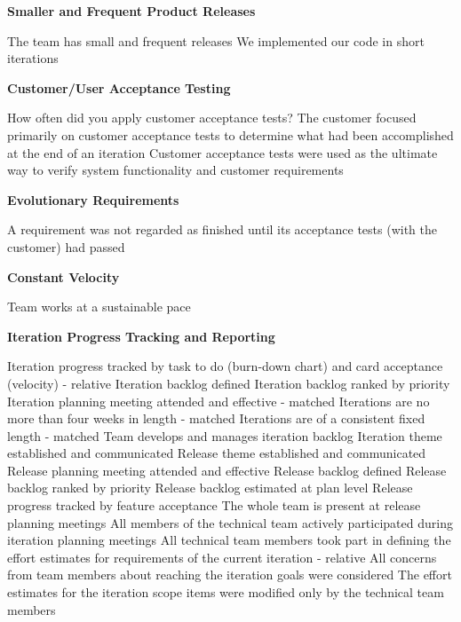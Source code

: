 \begin{appendices}
\textbf{Smaller and Frequent Product Releases}
\begin{itemize}
	\taa The team has small and frequent releases
	\pam We implemented our code in short iterations
\end{itemize}

\textbf{Customer/User Acceptance Testing}
\begin{itemize}
	\pamr How often did you apply customer acceptance tests?
	\pamr The customer focused primarily on customer acceptance tests to determine what had been accomplished at the end of an iteration
	\pamr Customer acceptance tests were used as the ultimate way to verify system functionality and customer requirements
\end{itemize}

\textbf{Evolutionary Requirements}
\begin{itemize}
	\pamr A requirement was not regarded as finished until its acceptance tests (with the customer) had passed
\end{itemize}

\textbf{Constant Velocity}
\begin{itemize}
	\taar Team works at a sustainable pace
\end{itemize}

\textbf{Iteration Progress Tracking and Reporting}
\begin{itemize}
	\taar Iteration progress tracked by task to do (burn-down chart) and card acceptance (velocity) - relative
	\taa Iteration backlog defined
	\taa Iteration backlog ranked by priority
	\taa Iteration planning meeting attended and effective - matched
	\taa Iterations are no more than four weeks in length - matched
	\taa Iterations are of a consistent fixed length - matched
	\taar Team develops and manages iteration backlog
	\taar Iteration theme established and communicated %
	\taar Release theme established and communicated 
	\taar Release planning meeting attended and effective 
	\taar Release backlog defined 
	\taar Release backlog ranked by priority 
	\taar Release backlog estimated at plan level 
	\taar Release progress tracked by feature acceptance
	\taar The whole team is present at release planning meetings
	\pamr All members of the technical team actively participated during iteration planning meetings
	\pamr All technical team members took part in defining the effort estimates for 
requirements of the current iteration - relative
	\pamr All concerns from team members about reaching the iteration goals were considered
	\pamr The effort estimates for the iteration scope items were modified only by the  technical team members %
\end{itemize}


\end{appendices}
